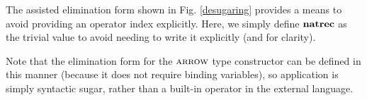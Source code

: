 \begin{enumerate}
The assisted elimination form shown in Fig. \ref{desugaring} provides a means to avoid providing an operator index explicitly. Here, we simply define ${\textbf{natrec}}$ as the trivial value to avoid needing to write it explicitly (and for clarity).

Note that the elimination form for the $\textsc{arrow}$ type constructor can be defined in this manner (because it does not require binding variables), so application is simply syntactic sugar, rather than a built-in operator in the external language.
\end{enumerate}

%
%
